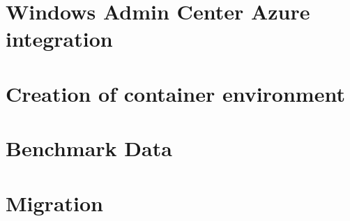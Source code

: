 \documentclass{bachproef-tin}
\begin{document}
\chapter{Windows Admin Center Azure integration}

\chapter{Creation of container environment}

\chapter{Benchmark Data}

\chapter{Migration}

%
\printbibliography[heading=bibintoc]
\end{document}
